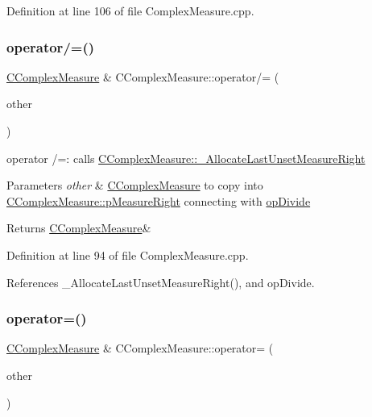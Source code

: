 Definition at line 106 of file Complex\+Measure.\+cpp.

\mbox{\label{classCComplexMeasure_a68c42a3ea08d1482f4dfdda5e34407f5}} 
\subsubsection{\texorpdfstring{operator/=()}{operator/=()}}
{\footnotesize\ttfamily \hyperlink{classCComplexMeasure}{C\+Complex\+Measure} \& C\+Complex\+Measure\+::operator/= (\begin{DoxyParamCaption}\item[{const \hyperlink{classCComplexMeasure}{C\+Complex\+Measure} \&}]{other }\end{DoxyParamCaption})}



operator /=\+: calls \hyperlink{classCComplexMeasure_aee812c93b8b2fe3839e9a38df63cfd53}{C\+Complex\+Measure\+::\+\_\+\+Allocate\+Last\+Unset\+Measure\+Right} 


\begin{DoxyParams}{Parameters}
{\em other} & \hyperlink{classCComplexMeasure}{C\+Complex\+Measure} to copy into \hyperlink{classCComplexMeasure_abbafc4b16676d223ed34860b8ece1b6b}{C\+Complex\+Measure\+::p\+Measure\+Right} connecting with \hyperlink{MeasureOperator_8h_a1431c79e3ad4b4c5bcc9f31f188538f2a160251a34f9a9a8ee362dc477d5ba790}{op\+Divide} \\
\hline
\end{DoxyParams}
\begin{DoxyReturn}{Returns}
\hyperlink{classCComplexMeasure}{C\+Complex\+Measure}\& 
\end{DoxyReturn}


Definition at line 94 of file Complex\+Measure.\+cpp.



References \+\_\+\+Allocate\+Last\+Unset\+Measure\+Right(), and op\+Divide.

\mbox{\label{classCComplexMeasure_a37668c1f7c157050080c0065ecbb596d}} 
\subsubsection{\texorpdfstring{operator=()}{operator=()}}
{\footnotesize\ttfamily \hyperlink{classCComplexMeasure}{C\+Complex\+Measure} \& C\+Complex\+Measure\+::operator= (\begin{DoxyParamCaption}\item[{const \hyperlink{classCComplexMeasure}{C\+Complex\+Measure} \&}]{other }\end{DoxyParamCaption})}



